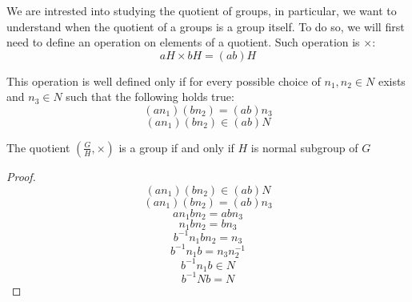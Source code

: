 We are intrested into studying the quotient of groups, in particular, we 
want to understand when the quotient of a groups is a group itself. To do so, we will first 
need to define an operation on elements of a quotient. Such operation is $\times$: \\

$$ aH \times bH = (ab)H $$ \vspace{0.2em}

This operation is well defined only if for every possible choice of $n_1, n_2 \in N$ 
exists and $n_3 \in N$ such that the following holds true: \\

$$ (an_1)(bn_2) = (ab)n_3 $$
$$ (an_1)(bn_2) \in (ab)N $$ \vspace{0.2em}

\begin{theorem}
\label{thm:quotientGroup}
    The quotient $(\frac{G}{H}, \times)$ is a group if and only if $H$ is normal subgroup of $G$
\end{theorem}
\begin{proof}
    $$ (an_1)(bn_2) \in (ab)N $$
    $$ (an_1)(bn_2) = (ab)n_3 $$
    $$ an_1bn_2 = abn_3 $$
    $$ n_1bn_2 = bn_3 $$
    $$ b^{-1}n_1bn_2 = n_3 $$
    $$ b^{-1}n_1b = n_3n_2^{-1} $$
    $$ b^{-1}n_1b \in N $$
    $$ b^{-1}Nb = N $$
\end{proof} \vspace{0.2em}

\newpage